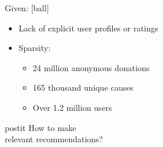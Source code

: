 
        
    \begin{block}{Given:}
        \begin{itemize}
            \item Lack of explicit user profiles or ratings
            \item Sparsity: 
                \begin{itemize}
                    \item 24 million anonymous donations 
                    \item 165 thousand unique causes
                    \item Over 1.2 million users
                \end{itemize} 
        \end{itemize}
	\end{block}

    \vspace{1ex}
    \hspace{6em}    
    \begin{beamercolorbox}[sep=1em,wd=0.40\textwidth]{postit}
        How to make\\ \alert{relevant} recommendations?
   	\end{beamercolorbox}
    \vspace{3ex}
